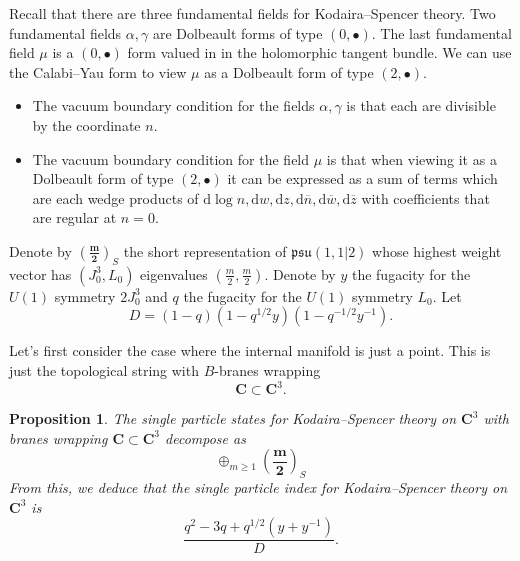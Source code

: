 \documentclass[11pt]{amsart}
\newcommand{\br}{\overline}
\renewcommand{\d}{\mathrm{d}}
\def\bu{{\bullet}}
\def\lie#1{\ensuremath{\mathfrak{#1}}}
\newcommand\C{\mathbf{C}}
\newcommand\beqn{\begin{equation}}
\newcommand\eeqn{\end{equation}}
\theoremstyle{thm}
\newtheorem{prop}[theorem]{Proposition}
\numberwithin{equation}{subsection}
\theoremstyle{def}
\theoremstyle{rem}
\begin{document}
Recall that there are three fundamental fields for Kodaira--Spencer theory.
Two fundamental fields $\alpha, \gamma$ are Dolbeault forms of type $(0,\bu)$.
The last fundamental field $\mu$ is a $(0,\bu)$ form valued in in the holomorphic tangent bundle.
We can use the Calabi--Yau form to view $\mu$ as a Dolbeault form of type $(2,\bu)$.

\begin{itemize}
\item The vacuum boundary condition for the fields $\alpha, \gamma$ is that each are divisible by the coordinate $n$. 
\item The vacuum boundary condition for the field $\mu$ is that when viewing it as a Dolbeault form of type $(2,\bu)$ it can be expressed as a sum of terms which are each wedge products of $\d \log n, \d w, \d z , \d \br n, \d \br w , \d \br z$ with coefficients that are regular at $n = 0$. 
\end{itemize} 

Denote by $\left(\mathbf{\frac{m}{2}}\right)_S$ the short representation of $\lie{psu}(1,1|2)$ whose highest weight vector has $(J_0^3,L_0)$ eigenvalues $(\frac{m}{2}, \frac{m}{2})$. 
Denote by $y$ the fugacity for the $U(1)$ symmetry $2J_0^3$ and $q$ the fugacity for the $U(1)$ symmetry $L_0$.
Let 
\beqn
D = (1-q)(1-q^{1/2} y)(1-q^{-1/2}y^{-1}) .
\eeqn

Let's first consider the case where the internal manifold is just a point.
This is just the topological string with $B$-branes wrapping 
\beqn
\C \subset \C^3 .
\eeqn 

\begin{prop}
The single particle states for Kodaira--Spencer theory on $\C^3$ with branes wrapping $\C \subset \C^3$ decompose as
\beqn
\oplus_{m \geq 1} \left(\mathbf{\frac{m}{2}}\right)_S 
\eeqn
From this, we deduce that the single particle index for Kodaira--Spencer theory on $\C^3$ is
\beqn
\frac{q^2 - 3 q + q^{1/2}(y+y^{-1})}{D} .
\eeqn
\end{prop}
\end{document}
